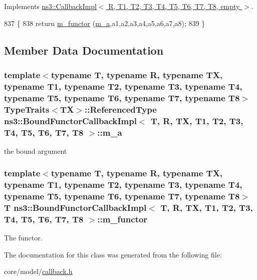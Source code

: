 Implements \hyperlink{classns3_1_1CallbackImpl_3_01R_00_01T1_00_01T2_00_01T3_00_01T4_00_01T5_00_01T6_00_01T7_00_01T8_00_01empty_01_4_aa70d806103504c4a1f7597d1b4d23d42}{ns3\+::\+Callback\+Impl$<$ R, T1, T2, T3, T4, T5, T6, T7, T8, empty $>$}.


\begin{DoxyCode}
837                                                                  \{
838     \textcolor{keywordflow}{return} \hyperlink{classns3_1_1BoundFunctorCallbackImpl_ad64916599b5cadd04158453c1e1359b0}{m\_functor} (\hyperlink{classns3_1_1BoundFunctorCallbackImpl_a61861c0e7e19a73e652cb661029852df}{m\_a},a1,a2,a3,a4,a5,a6,a7,a8);
839   \}
\end{DoxyCode}


\subsection{Member Data Documentation}
\subsubsection[{\texorpdfstring{m\+\_\+a}{m_a}}]{\setlength{\rightskip}{0pt plus 5cm}template$<$typename T, typename R, typename TX, typename T1, typename T2, typename T3, typename T4, typename T5, typename T6, typename T7, typename T8$>$ {\bf Type\+Traits}$<$TX$>$\+::Referenced\+Type {\bf ns3\+::\+Bound\+Functor\+Callback\+Impl}$<$ T, R, TX, T1, T2, T3, T4, T5, T6, T7, T8 $>$\+::m\+\_\+a\hspace{0.3cm}{\ttfamily [private]}}\hypertarget{classns3_1_1BoundFunctorCallbackImpl_a61861c0e7e19a73e652cb661029852df}{}\label{classns3_1_1BoundFunctorCallbackImpl_a61861c0e7e19a73e652cb661029852df}


the bound argument 

\subsubsection[{\texorpdfstring{m\+\_\+functor}{m_functor}}]{\setlength{\rightskip}{0pt plus 5cm}template$<$typename T, typename R, typename TX, typename T1, typename T2, typename T3, typename T4, typename T5, typename T6, typename T7, typename T8$>$ T {\bf ns3\+::\+Bound\+Functor\+Callback\+Impl}$<$ T, R, TX, T1, T2, T3, T4, T5, T6, T7, T8 $>$\+::m\+\_\+functor\hspace{0.3cm}{\ttfamily [private]}}\hypertarget{classns3_1_1BoundFunctorCallbackImpl_ad64916599b5cadd04158453c1e1359b0}{}\label{classns3_1_1BoundFunctorCallbackImpl_ad64916599b5cadd04158453c1e1359b0}


The functor. 



The documentation for this class was generated from the following file\+:\begin{DoxyCompactItemize}
\item 
core/model/\hyperlink{callback_8h}{callback.\+h}\end{DoxyCompactItemize}
